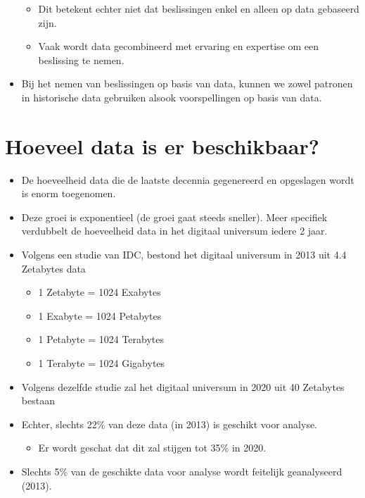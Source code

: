 \documentclass[]{memoir}
\providecommand{\tightlist}{%
  \setlength{\itemsep}{0pt}\setlength{\parskip}{0pt}}
\begin{document}
\begin{itemize}
  \begin{itemize}
  \tightlist
  \item
    Dit betekent echter niet dat beslissingen enkel en alleen op data
    gebaseerd zijn.
  \item
    Vaak wordt data gecombineerd met ervaring en expertise om een
    beslissing te nemen.
  \end{itemize}
\item
  Bij het nemen van beslissingen op basis van data, kunnen we zowel
  patronen in historische data gebruiken alsook voorspellingen op basis
  van data.
\end{itemize}

\section{Hoeveel data is er
beschikbaar?}\label{hoeveel-data-is-er-beschikbaar}

\begin{itemize}
\tightlist
\item
  De hoeveelheid data die de laatste decennia gegenereerd en opgeslagen
  wordt is enorm toegenomen.
\item
  Deze groei is exponentieel (de groei gaat steeds sneller). Meer
  specifiek verdubbelt de hoeveelheid data in het digitaal universum
  iedere 2 jaar.
\item
  Volgens een studie van IDC, bestond het digitaal universum in 2013 uit
  4.4 Zetabytes data

  \begin{itemize}
  \tightlist
  \item
    1 Zetabyte = 1024 Exabytes
  \item
    1 Exabyte = 1024 Petabytes
  \item
    1 Petabyte = 1024 Terabytes
  \item
    1 Terabyte = 1024 Gigabytes
  \end{itemize}
\item
  Volgens dezelfde studie zal het digitaal universum in 2020 uit 40
  Zetabytes bestaan
\item
  Echter, slechts 22\% van deze data (in 2013) is geschikt voor analyse.

  \begin{itemize}
  \tightlist
  \item
    Er wordt geschat dat dit zal stijgen tot 35\% in 2020.
  \end{itemize}
\item
  Slechts 5\% van de geschikte data voor analyse wordt feitelijk
  geanalyseerd (2013).
\end{itemize}
\end{document}
